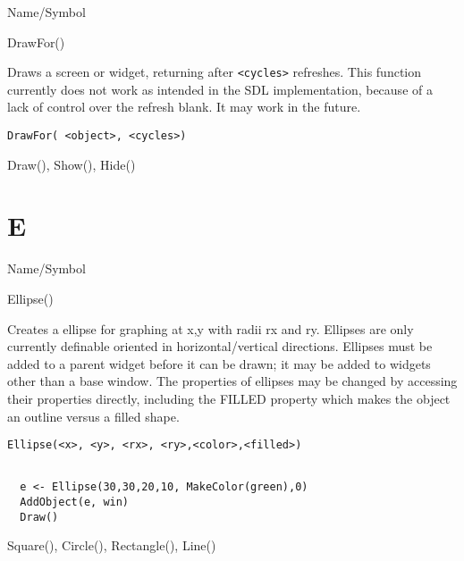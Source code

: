 \rl



\begin{desc}{Name/Symbol}
\item[Name/Symbol]	DrawFor()

\item[Description]  	Draws a screen or widget, returning after \verb+<cycles>+ refreshes. This function currently does not work as intended in the SDL implementation, because of a lack of control over the
		refresh blank.  It may work in the future.

\item[Usage]
\begin{verbatim}
DrawFor( <object>, <cycles>)
\end{verbatim}

\item[Example]	

\item[See Also]	Draw(), Show(), Hide()
\end{desc}

\rl
\section{E}
\rl




\begin{desc}{Name/Symbol}
\item[Name/Symbol]	Ellipse()
  
\item[Description]	Creates a ellipse for graphing at x,y with radii
  rx and ry. Ellipses are only currently definable oriented in
  horizontal/vertical directions.  Ellipses  must be added
  to a parent widget before it can be drawn; it may be added to
  widgets other than a base window.  The properties of ellipses may be
  changed by accessing their properties directly, including the FILLED
  property which makes the object an outline versus a filled shape.

\item[Usage]
\begin{verbatim}
Ellipse(<x>, <y>, <rx>, <ry>,<color>,<filled>)
\end{verbatim}

\item[Example]	
\begin{verbatim}
  
  e <- Ellipse(30,30,20,10, MakeColor(green),0)
  AddObject(e, win)
  Draw()

\end{verbatim}
\item[See Also]	Square(), Circle(), Rectangle(), Line()
\end{desc}

